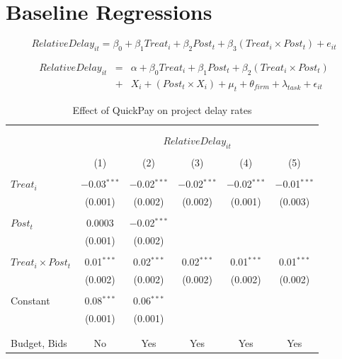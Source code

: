 \documentclass[
]{article}
\begin{document}
\hypertarget{baseline-regressions}{%
\section{Baseline Regressions}\label{baseline-regressions}}

\[ RelativeDelay_{it} = \beta_0 + \beta_1 Treat_i + \beta_2 Post_t + \beta_3 (Treat_i \times Post_t) + e_{it}\]

\[ \begin{aligned} RelativeDelay_{it} &=& \alpha+\beta_0 Treat_i + \beta_1 Post_t + \beta_2 (Treat_i \times Post_t)\\
&+&  X_i + (Post_t \times X_i) + \mu_t + \theta_{firm} + \lambda_{task}+ \epsilon_{it}
\end{aligned}\]

\begin{table}[H] \centering 
  \caption{Effect of QuickPay on project delay rates} 
  \label{} 
\small 
\begin{tabular}{@{\extracolsep{-2pt}}lccccc} 
\\[-1.8ex]\hline 
\hline \\[-1.8ex] 
\\[-1.8ex] & \multicolumn{5}{c}{$RelativeDelay_{it}$} \\ 
\\[-1.8ex] & (1) & (2) & (3) & (4) & (5)\\ 
\hline \\[-1.8ex] 
 $Treat_i$ & $-$0.03$^{***}$ & $-$0.02$^{***}$ & $-$0.02$^{***}$ & $-$0.02$^{***}$ & $-$0.01$^{***}$ \\ 
  & (0.001) & (0.002) & (0.002) & (0.001) & (0.003) \\ 
  & & & & & \\ 
 $Post_t$ & 0.0003 & $-$0.02$^{***}$ &  &  &  \\ 
  & (0.001) & (0.002) &  &  &  \\ 
  & & & & & \\ 
 $Treat_i \times Post_t$ & 0.01$^{***}$ & 0.02$^{***}$ & 0.02$^{***}$ & 0.01$^{***}$ & 0.01$^{***}$ \\ 
  & (0.002) & (0.002) & (0.002) & (0.002) & (0.002) \\ 
  & & & & & \\ 
 Constant & 0.08$^{***}$ & 0.06$^{***}$ &  &  &  \\ 
  & (0.001) & (0.001) &  &  &  \\ 
  & & & & & \\ 
\hline \\[-1.8ex] 
Budget, Bids & No & Yes & Yes & Yes & Yes \\ 

\end{tabular}
\end{table}
\end{document}
